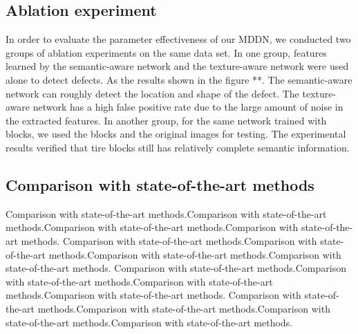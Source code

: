 \documentclass{article}
\begin{document}
\subsection{Ablation experiment}
\label{Ablation experiment}
In order to evaluate the parameter effectiveness of our MDDN, we conducted two groups of ablation experiments on the same data set. In one group, features learned by the semantic-aware network and the texture-aware network were used alone to detect defects. As the results shown in the figure **. The semantic-aware network can roughly detect the location and shape of the defect. The texture-aware network has a high false positive rate due to the large amount of noise in the extracted features. In another group, for the same network trained with blocks, we used the blocks and the original images for testing. The experimental results verified that tire blocks still has relatively complete semantic information.

\subsection{Comparison with state-of-the-art methods}
\label{state-of-the-art methods}
Comparison with state-of-the-art methods.Comparison with state-of-the-art methods.Comparison with state-of-the-art methods.Comparison with state-of-the-art methods.
Comparison with state-of-the-art methods.Comparison with state-of-the-art methods.Comparison with state-of-the-art methods.Comparison with state-of-the-art methods.
Comparison with state-of-the-art methods.Comparison with state-of-the-art methods.Comparison with state-of-the-art methods.Comparison with state-of-the-art methods.
Comparison with state-of-the-art methods.Comparison with state-of-the-art methods.Comparison with state-of-the-art methods.Comparison with state-of-the-art methods.

%
%
%
\end{document}

